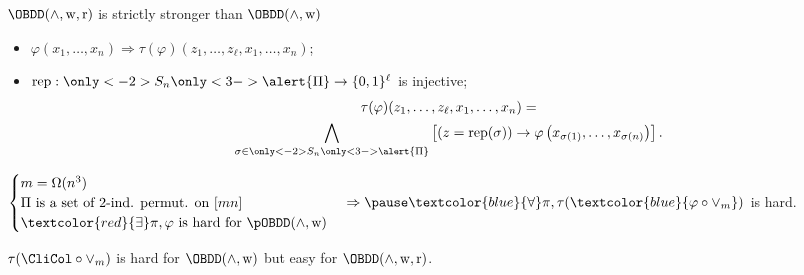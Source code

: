 \begin{frame}{$\OBDD(\land, \weakening, \reordering)$ is strictly stronger than $\OBDD(\land, \weakening)$}

    \pause

    \begin{itemize}
        \item $\varphi(x_1, \dots, x_n) \Rightarrow \tau(\varphi)(z_1,
            \dots, z_{\ell}, x_1, \dots, x_n)$;
        \item $\mathrm{rep}: \only<-2>{S_n}\only<3->{\alert{\Pi}} \to \{0, 1\}^{\ell}$ is injective;
        \begin{multline*}
            \tau(\varphi)(z_1, \dots, z_{\ell}, x_1, \dots, x_n) = \\
            \bigwedge\limits_{\sigma \in \only<-2>{S_n}\only<3->{\alert{\Pi}}} \left[\left( z =
                \mathrm{rep}(\sigma) \right) \to \varphi\left(x_{\sigma(1)}, \dots, x_{\sigma(n)}\right)
            \right].
        \end{multline*}
    \end{itemize}

    \pause
    \pause


    \begin{theorem}[Segerlind 07]
        $
        \begin{cases}
            m = \Omega(n^3) \\
            \Pi \text{ is a set of 2-ind. permut. on } [mn] \\
            \textcolor{red}{\exists} \pi, \varphi \text{ is hard for } \pOBDD(\land, \weakening)
        \end{cases}
        \Rightarrow \pause \textcolor{blue}{\forall} \pi, \tau(\textcolor{blue}{\varphi \circ \lor_m})$ is hard.
    \end{theorem}

    \pause
    \begin{corollary}
        $\tau(\CliCol \circ \lor_m)$ is hard for $\OBDD(\land, \weakening)$ but easy for
        $\OBDD(\land, \weakening, \reordering)$. 
    \end{corollary}
\end{frame}